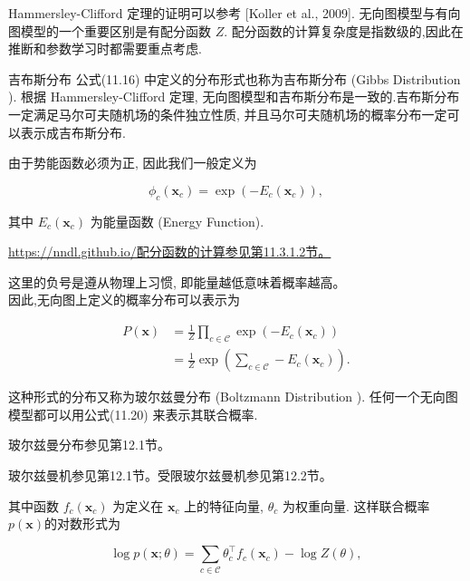 \documentclass[10pt]{article}
\begin{document}
Hammersley-Clifford 定理的证明可以参考 [Koller et al., 2009]. 无向图模型与有向图模型的一个重要区别是有配分函数 $Z$. 配分函数的计算复杂度是指数级的,因此在推断和参数学习时都需要重点考虑.

吉布斯分布 公式(11.16) 中定义的分布形式也称为吉布斯分布 (Gibbs Distribution ). 根据 Hammersley-Clifford 定理, 无向图模型和吉布斯分布是一致的.吉布斯分布一定满足马尔可夫随机场的条件独立性质, 并且马尔可夫随机场的概率分布一定可以表示成吉布斯分布.

由于势能函数必须为正, 因此我们一般定义为


\begin{equation*}
\phi_{c}\left(\boldsymbol{x}_{c}\right)=\exp \left(-E_{c}\left(\boldsymbol{x}_{c}\right)\right), \tag{11.18}
\end{equation*}


其中 $E_{c}\left(\boldsymbol{x}_{c}\right)$ 为能量函数 (Energy Function).

\href{https://nndl.github.io/%E9%85%8D%E5%88%86%E5%87%BD%E6%95%B0%E7%9A%84%E8%AE%A1%E7%AE%97%E5%8F%82%E8%A7%81%E7%AC%AC11.3.1.2%E8%8A%82%E3%80%82}{https://nndl.github.io/配分函数的计算参见第11.3.1.2节。}

这里的负号是遵从物理上习惯, 即能量越低意味着概率越高。\\
因此,无向图上定义的概率分布可以表示为


\begin{align*}
P(\boldsymbol{x}) & =\frac{1}{Z} \prod_{c \in \mathcal{C}} \exp \left(-E_{c}\left(\boldsymbol{x}_{c}\right)\right)  \tag{11.19}\\
& =\frac{1}{Z} \exp \left(\sum_{c \in \mathcal{C}}-E_{c}\left(\boldsymbol{x}_{c}\right)\right) . \tag{11.20}
\end{align*}


这种形式的分布又称为玻尔兹曼分布 (Boltzmann Distribution ). 任何一个无向图模型都可以用公式(11.20) 来表示其联合概率.

玻尔兹曼分布参见第12.1节。

玻尔兹曼机参见第12.1节。受限玻尔兹曼机参见第12.2节。

其中函数 $f_{c}\left(\boldsymbol{x}_{c}\right)$ 为定义在 $\boldsymbol{x}_{c}$ 上的特征向量, $\theta_{c}$ 为权重向量. 这样联合概率 $p(\boldsymbol{x})$的对数形式为


\begin{equation*}
\log p(\boldsymbol{x} ; \theta)=\sum_{c \in \mathcal{C}} \theta_{c}^{\top} f_{c}\left(\boldsymbol{x}_{c}\right)-\log Z(\theta), \tag{11.22}
\end{equation*}
\end{document}
